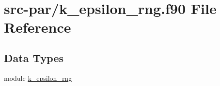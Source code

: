 \hypertarget{k__epsilon__rng_8f90}{\section{src-\/par/k\-\_\-epsilon\-\_\-rng.f90 File Reference}
\label{k__epsilon__rng_8f90}
}
\subsection*{Data Types}
\begin{DoxyCompactItemize}
\item 
module \hyperlink{classk__epsilon__rng}{k\-\_\-epsilon\-\_\-rng}
\end{DoxyCompactItemize}
